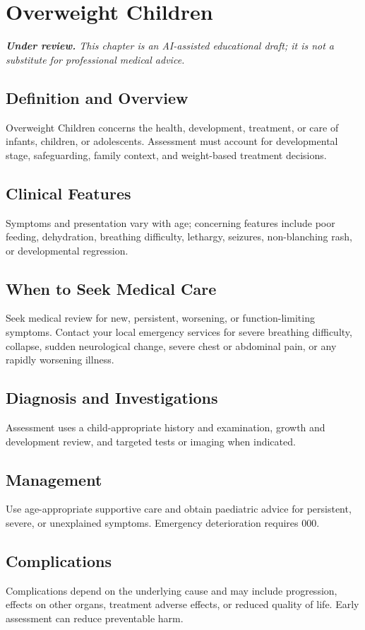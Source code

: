 \chapter{Overweight Children}

\medskip
\noindent\textit{\textbf{Under review.} This chapter is an AI-assisted educational draft; it is not a substitute for professional medical advice.}

\section*{Definition and Overview}
Overweight Children concerns the health, development, treatment, or care of infants, children, or adolescents. Assessment must account for developmental stage, safeguarding, family context, and weight-based treatment decisions.

\section*{Clinical Features}
Symptoms and presentation vary with age; concerning features include poor feeding, dehydration, breathing difficulty, lethargy, seizures, non-blanching rash, or developmental regression.

\section*{When to Seek Medical Care}
Seek medical review for new, persistent, worsening, or function-limiting symptoms. Contact your local emergency services for severe breathing difficulty, collapse, sudden neurological change, severe chest or abdominal pain, or any rapidly worsening illness.

\section*{Diagnosis and Investigations}
Assessment uses a child-appropriate history and examination, growth and development review, and targeted tests or imaging when indicated.

\section*{Management}
Use age-appropriate supportive care and obtain paediatric advice for persistent, severe, or unexplained symptoms. Emergency deterioration requires 000.

\section*{Complications}
Complications depend on the underlying cause and may include progression, effects on other organs, treatment adverse effects, or reduced quality of life. Early assessment can reduce preventable harm.

